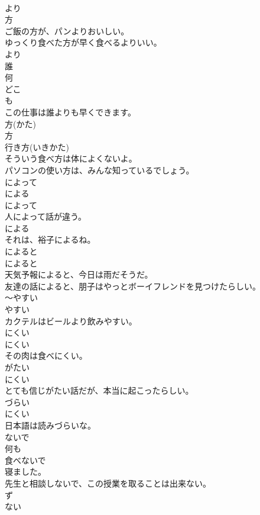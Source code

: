 \documentclass[8pt]{extreport}
\begin{document}
\begin{CJK}{UTF8}{min}
\\	より	
\\	方 
\\	ご飯の方が、パンよりおいしい。
\\	ゆっくり食べた方が早く食べるよりいい。
\\	より 
\\	誰
\\	何
\\	どこ	
\\	も 
\\	この仕事は誰よりも早くできます。
\\	方(かた)	
\\	方 
\\	行き方(いきかた) 
\\	そういう食べ方は体によくないよ。
\\	パソコンの使い方は、みんな知っているでしょう。
\\	によって 
\\	による	
\\	によって 
\\	人によって話が違う。
\\	による 
\\	それは、裕子によるね。
\\	によると	
\\	によると 
\\	天気予報によると、今日は雨だそうだ。
\\	友達の話によると、朋子はやっとボーイフレンドを見つけたらしい。 
\\	〜やすい	
\\	やすい 
\\	カクテルはビールより飲みやすい。
\\	にくい	
\\	にくい 
\\	その肉は食べにくい。
\\	がたい	
\\	にくい 
\\	とても信じがたい話だが、本当に起こったらしい。
\\	づらい	
\\	にくい 
\\	日本語は読みづらいな。
\\	ないで 
\\	何も
\\	食べないで
\\	寝ました。
\\	先生と相談しないで、この授業を取ることは出来ない。
\\	ず 
\\	ない 

\end{CJK}
\end{document}
